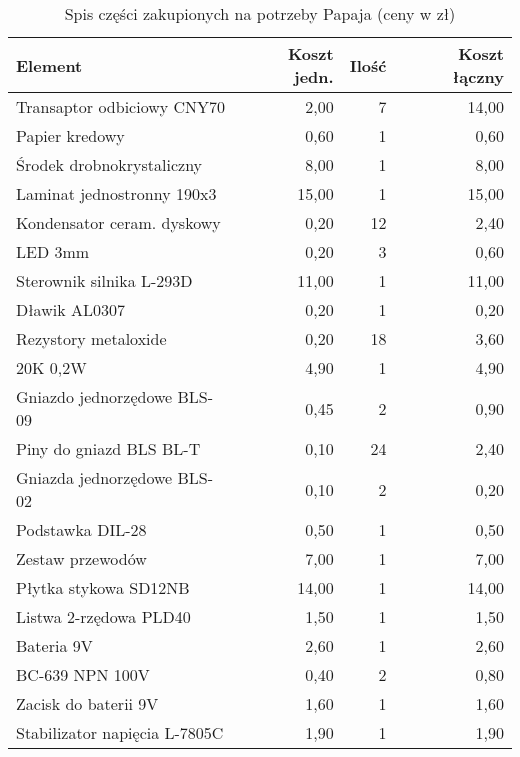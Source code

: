 \documentclass{article}
\begin{document}
\begin{table}[c]
\caption{Spis części zakupionych na potrzeby Papaja (ceny w zł)}
\label{table:koszta}
\centering
\begin{tabular}{l|r|r|r}
Element                       & Koszt jedn. & Ilość & Koszt łączny \\
\hline
Transaptor odbiciowy CNY70    & 2,00        & 7     & 14,00        \\
Papier kredowy                & 0,60        & 1     & 0,60         \\
Środek drobnokrystaliczny     & 8,00        & 1     & 8,00         \\
Laminat jednostronny 190x3    & 15,00       & 1     & 15,00        \\
Kondensator ceram. dyskowy    & 0,20        & 12    & 2,40         \\
LED 3mm                       & 0,20        & 3     & 0,60         \\
Sterownik silnika L-293D      & 11,00       & 1     & 11,00        \\
Dławik AL0307                 & 0,20        & 1     & 0,20         \\
Rezystory metaloxide          & 0,20        & 18    & 3,60         \\
20K 0,2W                      & 4,90        & 1     & 4,90         \\
Gniazdo jednorzędowe BLS-09   & 0,45        & 2     & 0,90         \\
Piny do gniazd BLS BL-T       & 0,10        & 24    & 2,40         \\
Gniazda jednorzędowe BLS-02   & 0,10        & 2     & 0,20         \\
Podstawka DIL-28              & 0,50        & 1     & 0,50         \\
Zestaw przewodów              & 7,00        & 1     & 7,00         \\
Płytka stykowa SD12NB         & 14,00       & 1     & 14,00        \\
Listwa 2-rzędowa PLD40        & 1,50        & 1     & 1,50         \\
Bateria 9V                    & 2,60        & 1     & 2,60         \\
BC-639 NPN 100V               & 0,40        & 2     & 0,80         \\
Zacisk do baterii 9V          & 1,60        & 1     & 1,60         \\
Stabilizator napięcia L-7805C & 1,90        & 1     & 1,90         \\

\end{tabular}
\end{table}
\end{document}
